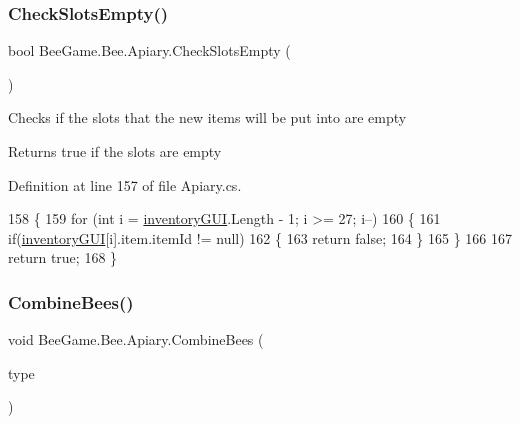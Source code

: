 \subsubsection{\texorpdfstring{Check\+Slots\+Empty()}{CheckSlotsEmpty()}}
{\footnotesize\ttfamily bool Bee\+Game.\+Bee.\+Apiary.\+Check\+Slots\+Empty (\begin{DoxyParamCaption}{ }\end{DoxyParamCaption})\hspace{0.3cm}{\ttfamily [private]}}



Checks if the slots that the new items will be put into are empty 

\begin{DoxyReturn}{Returns}
true if the slots are empty
\end{DoxyReturn}


Definition at line 157 of file Apiary.\+cs.


\begin{DoxyCode}
158         \{
159             \textcolor{keywordflow}{for} (\textcolor{keywordtype}{int} i = \hyperlink{class_bee_game_1_1_inventory_1_1_inventory_base_a48dcba7ad7bfa1bed8c9ae290fb32857}{inventoryGUI}.Length - 1; i >= 27; i--)
160             \{
161                 \textcolor{keywordflow}{if}(\hyperlink{class_bee_game_1_1_inventory_1_1_inventory_base_a48dcba7ad7bfa1bed8c9ae290fb32857}{inventoryGUI}[i].item.itemId != null)
162                 \{
163                     \textcolor{keywordflow}{return} \textcolor{keyword}{false};
164                 \}
165             \}
166 
167             \textcolor{keywordflow}{return} \textcolor{keyword}{true};
168         \}
\end{DoxyCode}
\mbox{\label{class_bee_game_1_1_bee_1_1_apiary_a5e302eef156ac1610cb37720d41b8077}} 
\subsubsection{\texorpdfstring{Combine\+Bees()}{CombineBees()}}
{\footnotesize\ttfamily void Bee\+Game.\+Bee.\+Apiary.\+Combine\+Bees (\begin{DoxyParamCaption}\item[{\hyperlink{namespace_bee_game_1_1_enums_a9376a1582db99d20c756e24de728944f}{Bee\+Type}}]{type }\end{DoxyParamCaption})\hspace{0.3cm}{\ttfamily [private]}}



